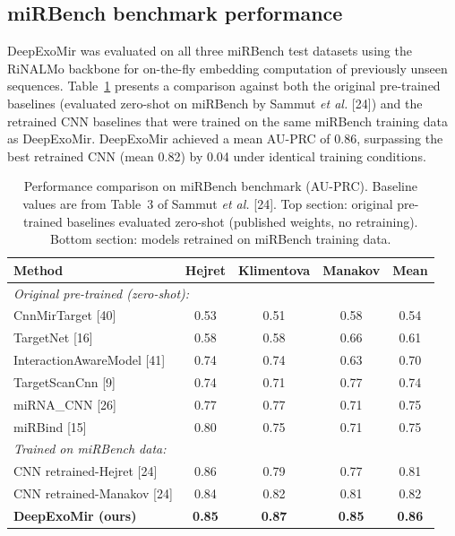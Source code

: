 \documentclass[sn-mathphys-num]{sn-jnl}
\begin{document}
\subsection{miRBench benchmark performance}

DeepExoMir was evaluated on all three miRBench test datasets using the RiNALMo backbone for on-the-fly embedding computation of previously unseen sequences. Table~\ref{tab:mirbench} presents a comparison against both the original pre-trained baselines (evaluated zero-shot on miRBench by Sammut \textit{et al.} [24]) and the retrained CNN baselines that were trained on the same miRBench training data as DeepExoMir. DeepExoMir achieved a mean AU-PRC of 0.86, surpassing the best retrained CNN (mean 0.82) by 0.04 under identical training conditions.

\begin{table}[!t]
\caption{Performance comparison on miRBench benchmark (AU-PRC). Baseline values are from Table~3 of Sammut \textit{et al.} [24]. Top section: original pre-trained baselines evaluated zero-shot (published weights, no retraining). Bottom section: models retrained on miRBench training data.}\label{tab:mirbench}
\begin{tabular}{@{}lcccc@{}}
\toprule
Method & Hejret & Klimentova & Manakov & Mean \\
\midrule
\multicolumn{5}{l}{\textit{Original pre-trained (zero-shot):}} \\
CnnMirTarget [40] & 0.53 & 0.51 & 0.58 & 0.54 \\
TargetNet [16] & 0.58 & 0.58 & 0.66 & 0.61 \\
InteractionAwareModel [41] & 0.74 & 0.74 & 0.63 & 0.70 \\
TargetScanCnn [9] & 0.74 & 0.71 & 0.77 & 0.74 \\
miRNA\_CNN [26] & 0.77 & 0.77 & 0.71 & 0.75 \\
miRBind [15] & 0.80 & 0.75 & 0.71 & 0.75 \\
\midrule
\multicolumn{5}{l}{\textit{Trained on miRBench data:}} \\
CNN retrained-Hejret [24] & 0.86 & 0.79 & 0.77 & 0.81 \\
CNN retrained-Manakov [24] & 0.84 & 0.82 & 0.81 & 0.82 \\
\textbf{DeepExoMir (ours)} & \textbf{0.85} & \textbf{0.87} & \textbf{0.85} & \textbf{0.86} \\
\bottomrule
\end{tabular}
\end{table}
\end{document}
